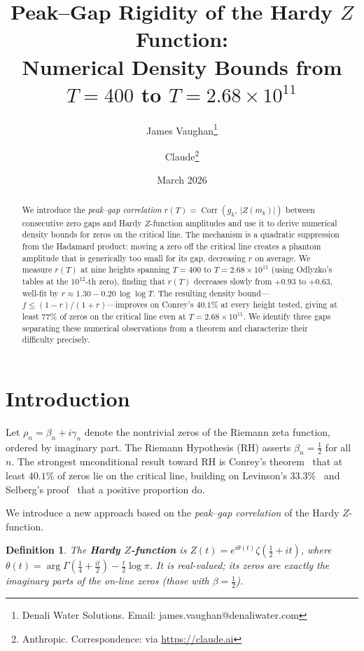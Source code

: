 \documentclass[11pt,a4paper]{article}
\title{Peak--Gap Rigidity of the Hardy $Z$ Function:\\
Numerical Density Bounds from $T = 400$ to $T = 2.68 \times 10^{11}$}
\author{James Vaughan\thanks{Denali Water Solutions. Email: james.vaughan@denaliwater.com}
\and Claude\thanks{Anthropic. Correspondence: via \url{https://claude.ai}}}
\date{March 2026}
\newtheorem{definition}[theorem]{Definition}
\DeclareMathOperator{\Corr}{Corr}
\begin{document}
\maketitle

\begin{abstract}
We introduce the \emph{peak--gap correlation}
$r(T) = \Corr(g_k,\, |Z(m_k)|)$
between consecutive zero gaps and Hardy $Z$-function amplitudes
and use it to derive numerical density bounds for zeros on the critical line.
The mechanism is a quadratic suppression from the Hadamard product: moving a zero off the critical line creates a phantom amplitude that is generically too small for its gap, decreasing $r$ on average.
We measure $r(T)$ at nine heights spanning $T = 400$ to $T = 2.68 \times 10^{11}$ (using Odlyzko's tables at the $10^{12}$-th zero), finding that $r(T)$ decreases slowly from $+0.93$ to $+0.63$, well-fit by $r \approx 1.30 - 0.20\,\log\log T$.
The resulting density bound---$f \leq (1-r)/(1+r)$---improves on Conrey's $40.1\%$ at every height tested, giving at least $77\%$ of zeros on the critical line even at $T = 2.68 \times 10^{11}$.
We identify three gaps separating these numerical observations from a theorem and characterize their difficulty precisely.
\end{abstract}

\section{Introduction}

Let $\rho_n = \beta_n + i\gamma_n$ denote the nontrivial zeros of the Riemann zeta function, ordered by imaginary part.
The Riemann Hypothesis (RH) asserts $\beta_n = \frac{1}{2}$ for all~$n$.
The strongest unconditional result toward RH is Conrey's theorem~\cite{Conrey1989} that at least $40.1\%$ of zeros lie on the critical line, building on Levinson's $33.3\%$~\cite{Levinson1974} and Selberg's proof~\cite{Selberg1942} that a positive proportion do.

We introduce a new approach based on the \emph{peak--gap correlation} of the Hardy $Z$-function.

\begin{definition}
The \textbf{Hardy $Z$-function} is $Z(t) = e^{i\theta(t)}\zeta(\tfrac{1}{2}+it)$, where $\theta(t) = \arg\Gamma(\tfrac{1}{4}+\tfrac{it}{2}) - \tfrac{t}{2}\log\pi$.
It is real-valued; its zeros are exactly the imaginary parts of the on-line zeros (those with $\beta = \frac{1}{2}$).
\end{definition}
\end{document}
